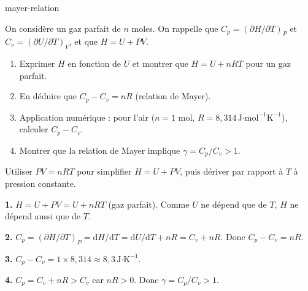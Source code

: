 
\begin{exo}[Relation de Mayer : $C_p - C_v = nR$]{mayer-relation}

On considère un gaz parfait de $n$ moles. On rappelle que $C_p = \left(\partial H/\partial T\right)_P$ et $C_v = \left(\partial U/\partial T\right)_V$, et que $H = U + PV$.

\begin{enumerate}
  \item Exprimer $H$ en fonction de $U$ et montrer que $H = U + nRT$ pour un gaz parfait.
  \item En déduire que $C_p - C_v = nR$ (relation de Mayer).
  \item Application numérique : pour l'air ($n=1$ mol, $R = 8{,}314\,\text{J·mol}^{-1}\text{K}^{-1}$), calculer $C_p - C_v$.
  \item Montrer que la relation de Mayer implique $\gamma = C_p/C_v > 1$.
\end{enumerate}

\begin{indication}
Utiliser $PV = nRT$ pour simplifier $H = U + PV$, puis dériver par rapport à $T$ à pression constante.
\end{indication}

\begin{solution}
\textbf{1.} $H = U + PV = U + nRT$ (gaz parfait). Comme $U$ ne dépend que de $T$, $H$ ne dépend aussi que de $T$.

\textbf{2.} $C_p = \left(\partial H/\partial T\right)_P = \mathrm{d}H/\mathrm{d}T = \mathrm{d}U/\mathrm{d}T + nR = C_v + nR$. Donc $C_p - C_v = nR$.

\textbf{3.} $C_p - C_v = 1 \times 8{,}314 \approx 8{,}3\,\text{J·K}^{-1}$.

\textbf{4.} $C_p = C_v + nR > C_v$ car $nR > 0$. Donc $\gamma = C_p/C_v > 1$.
\end{solution}

\end{exo}

